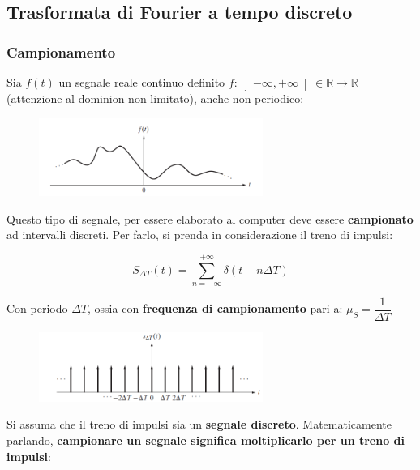 \documentclass[a4paper]{article}
\begin{document}
	\newpage
	
	\subsection{Trasformata di Fourier a tempo discreto}\label{trasformata di fourier a tempo discreto}
	
	\subsubsection{Campionamento}
	
	Sia $f\left(t\right)$ un segnale reale continuo definito $f : \left] -\infty, + \infty \right[ \in \mathbb{R} \rightarrow \mathbb{R}$ (attenzione al dominion non limitato), anche non periodico:
	
	\begin{figure}[!htp]
		\centering
		\includegraphics[width=0.65\textwidth]{img/campionamento_1.png}
	\end{figure}

	\noindent
	Questo tipo di segnale, per essere elaborato al computer deve essere \textbf{campionato} ad intervalli discreti. Per farlo, si prenda in considerazione il treno di impulsi:
	
	\begin{equation*}
		S_{\Delta T} \left(t\right) = \sum_{n = -\infty}^{+\infty} \delta\left(t - n\Delta T\right)
	\end{equation*}

	\noindent
	Con periodo $\Delta T$, ossia con \textbf{frequenza di campionamento} pari a: $\mu_{S} = \dfrac{1}{\Delta T}$

	\begin{figure}[!htp]
		\centering
		\includegraphics[width=0.65\textwidth]{img/campionamento_2.png}
	\end{figure}

	\noindent
	Si assuma che il treno di impulsi sia un \textbf{segnale discreto}. Matematicamente parlando, \textbf{campionare un segnale \underline{significa} moltiplicarlo per un treno di impulsi}:
	
\end{document}

